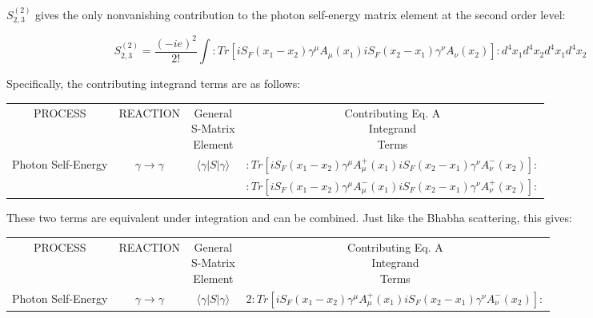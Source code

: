 \documentclass[a4]{article}
\begin{document}
    $S^{(2)}_{2,3}$ gives the only nonvanishing contribution to the photon self-energy matrix element at the second order level:

    \begin{framed}
        \begin{equation}
            S^{(2)}_{2,3} = \frac{(-ie)^2}{2!} \int :Tr[i S_{F} (x_1 - x_2) \gamma^{\mu} A_{\mu} (x_1) i S_{F} (x_2 - x_1) \gamma^{\nu} A_{\nu} (x_2)]: d^{4} x_{1} d^{4} x_{2} d^{4} x_{1} d^{4} x_{2}
        \end{equation}
    \end{framed}

    Specifically, the contributing integrand terms are as follows:

    \begin{framed}
        \begin{tabular}{c c c c}
            PROCESS & REACTION & \shortstack{General \\ S-Matrix \\ Element} & \shortstack{Contributing Eq. A \\ Integrand \\ Terms} \\
            Photon Self-Energy & $\gamma \rightarrow \gamma$ & $\langle \gamma | S | \gamma \rangle$ & $:Tr[i S_{F} (x_1 - x_2) \gamma^{\mu} A^{+}_{\mu} (x_1) i S_{F} (x_2 - x_1) \gamma^{\nu} A^{-}_{\nu} (x_2)]:$ \\
            & & & $:Tr[i S_{F} (x_1 - x_2) \gamma^{\mu} A^{-}_{\mu} (x_1) i S_{F} (x_2 - x_1) \gamma^{\nu} A^{+}_{\nu} (x_2)]:$
        \end{tabular}
    \end{framed}

    These two terms are equivalent under integration and can be combined. Just like the Bhabha scattering, this gives:

    \begin{framed}
        \begin{tabular}{c c c c}
            PROCESS & REACTION & \shortstack{General \\ S-Matrix \\ Element} & \shortstack{Contributing Eq. A \\ Integrand \\ Terms} \\
            Photon Self-Energy & $\gamma \rightarrow \gamma$ & $\langle \gamma | S | \gamma \rangle$ & $2 :Tr[i S_{F} (x_1 - x_2) \gamma^{\mu} A^{+}_{\mu} (x_1) i S_{F} (x_2 - x_1) \gamma^{\nu} A^{-}_{\nu} (x_2)]:$
        \end{tabular}
    \end{framed}
\end{document}
